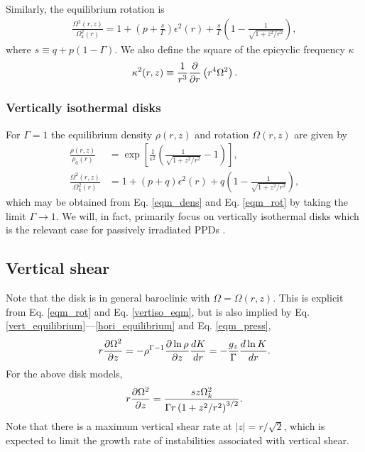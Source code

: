 Similarly, the equilibrium rotation is 
\begin{align}\label{eqm_rot}
  \frac{\Omega^2(r,z)}{\Omega_k^2(r)}=1 +
  \left(p+\frac{s}{\Gamma}\right)\epsilon^2(r) 
  +\frac{s}{\Gamma} \left(1-\frac{1}{\sqrt{1+z^2/r^2}}\right), 
\end{align}
where $s\equiv q+p(1-\Gamma)$. We also define %
the square of the epicyclic frequency $\kappa$ 
\begin{align}
  \kappa^2(r,z) \equiv \frac{1}{r^3}\frac{\p }{\p
    r}\left(r^4\Omega^2\right). %
\end{align}


\subsubsection{Vertically isothermal disks}
For $\Gamma=1$ the equilibrium density $\rho(r,z)$ and rotation
$\Omega(r,z)$ are given by 
\begin{align}
  \frac{\rho(r,z)}{\rho_0(r)} &=
  \exp{\left[\frac{1}{\epsilon^2}\left(\frac{1}{\sqrt{1+z^2/r^2}}-1\right)\right]},\\    
  \frac{\Omega^2(r,z)}{\Omega_k^2(r)}& =1+ (p+q)\epsilon^2(r) + q\left(1 -
    \frac{1}{\sqrt{1+z^2/r^2}}\right),\label{vertiso_eqm}
\end{align}
which may be obtained from Eq. \ref{eqm_dens} and Eq. \ref{eqm_rot} by
taking the limit $\Gamma\to 1$. We will, in fact, primarily focus on
vertically isothermal disks which is the relevant case for passively irradiated
PPDs \citep{chiang97}. 


\subsection{Vertical shear}\label{vshear_def}
Note that the disk is in general baroclinic with $\Omega =
\Omega(r,z)$. This is explicit from Eq. \ref{eqm_rot} and Eq. \ref{vertiso_eqm}, but is also 
implied by Eq. \ref{vert_equilibrium}---\ref{hori_equilibrium} and 
Eq. \ref{eqm_press},  
\begin{align}
  r\frac{\partial\Omega^2}{\partial z} = - \rho^{\Gamma-1}\frac{\partial\ln\rho}{\partial
    z}\frac{dK}{dr} = - \frac{g_z}{\Gamma}\frac{d\ln K}{dr}.\label{vertical_shear}
\end{align}
For the above disk models,
\begin{align}
  r\frac{\partial\Omega^2}{\partial z} = \frac{sz\Omega_k^2}{\Gamma
    r\left(1+z^2/r^2\right)^{3/2}}. \label{vertical_shear_ex} 
\end{align}
Note that there is a maximum vertical shear rate at $|z|=r/\sqrt{2}$,
which is expected to limit the growth rate of instabilities associated with vertical shear. 

